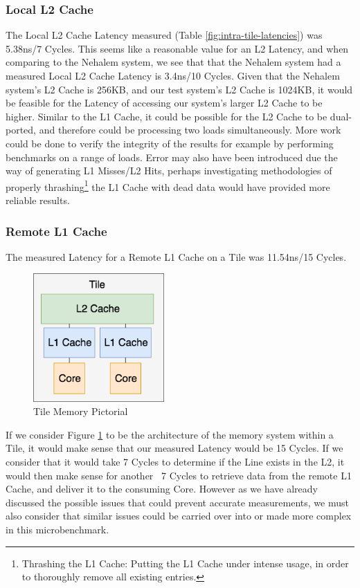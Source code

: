 \documentclass[bsc,frontabs,twoside,singlespacing,parskip,deptreport]{infthesis}     %
\begin{document}
\subsubsection{Local L2 Cache}
The Local L2 Cache Latency measured (Table \ref{fig:intra-tile-latencies}) was 5.38ns/7 Cycles. This seems like a reasonable value for an L2 Latency, and when comparing to the Nehalem system, we see that that the Nehalem system had a measured Local L2 Cache Latency is 3.4ns/10 Cycles. Given that the Nehalem system's L2 Cache is 256KB, and our test system's L2 Cache is 1024KB, it would be feasible for the Latency of accessing our system's larger L2 Cache to be higher. Similar to the L1 Cache, it could be possible for the L2 Cache to be dual-ported, and therefore could be processing two loads simultaneously. More work could be done to verify the integrity of the results for example by performing benchmarks on a range of loads. Error may also have been introduced due the way of generating L1 Misses/L2 Hits, perhaps investigating methodologies of properly thrashing\footnote{Thrashing the L1 Cache: Putting the L1 Cache under intense usage, in order to thoroughly remove all existing entries.} the L1 Cache with dead data would have provided more reliable results.

\subsubsection{Remote L1 Cache}
The measured Latency for a Remote L1 Cache on a Tile was 11.54ns/15 Cycles. \\

\begin{figure}[!h]
    \centering
    \includegraphics[width=5cm]{Tile.png}
    \caption{Tile Memory Pictorial}
    \label{fig:tile-memory}
\end{figure}
If we consider Figure \ref{fig:tile-memory} to be the architecture of the memory system within a Tile, it would make sense that our measured Latency would be 15 Cycles. If we consider that it would take 7 Cycles to determine if the Line exists in the L2, it would then make sense for another ~7 Cycles to retrieve data from the remote L1 Cache, and deliver it to the consuming Core. However as we have already discussed the possible issues that could prevent accurate measurements, we must also consider that similar issues could be carried over into or made more complex in this microbenchmark.
\end{document}
